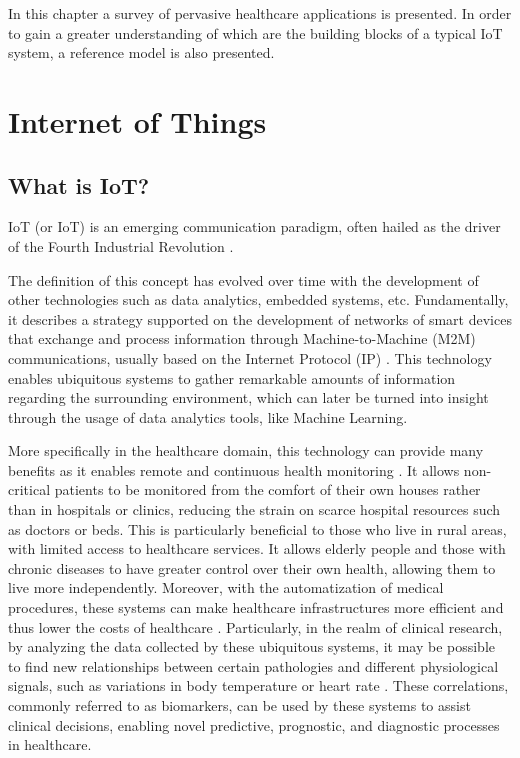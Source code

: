 In this chapter a survey of pervasive healthcare applications is presented. In order to gain a greater understanding of which are the building blocks of a typical \acf{IoT} system, a reference model is also presented.

\section{Internet of Things}

\subsection{What is IoT?}

\acl{IoT} (or \acs{IoT}) is an emerging communication paradigm, often hailed as the driver of the Fourth Industrial Revolution \cite{Aceto2020}. \bigskip

The definition of this concept has evolved over time with the development of other technologies such as data analytics, embedded systems, etc. Fundamentally, it describes a strategy supported on the development of networks of smart devices that exchange and process information through Machine-to-Machine (M2M) communications, usually based on the Internet Protocol (IP) \cite{Baker2017}. This technology enables ubiquitous systems to gather remarkable amounts of information regarding the surrounding environment, which can later be turned into insight through the usage of data analytics tools, like Machine Learning. \bigskip

More specifically in the healthcare domain, this technology can provide many benefits as it enables remote and continuous health monitoring \cite{Doukas2012, Wu2020, Fan2014}. It allows non-critical patients to be monitored from the comfort of their own houses rather than in hospitals or clinics, reducing the strain on scarce hospital resources such as doctors or beds. This is particularly beneficial to those who live in rural areas, with limited access to healthcare services. It allows elderly people and those with chronic diseases to have greater control over their own health, allowing them to live more independently. Moreover, with the automatization of medical procedures, these systems can make healthcare infrastructures more efficient and thus lower the costs of healthcare \cite{Catarinucci2015, Adame2018}. Particularly, in the realm of clinical research, by analyzing the data collected by these ubiquitous systems, it may be possible to find new relationships between certain pathologies and different physiological signals, such as variations in body temperature or heart rate \cite{Choi2016}. These correlations, commonly referred to as biomarkers, can be used by these systems to assist clinical decisions, enabling novel predictive, prognostic, and diagnostic processes in healthcare.


